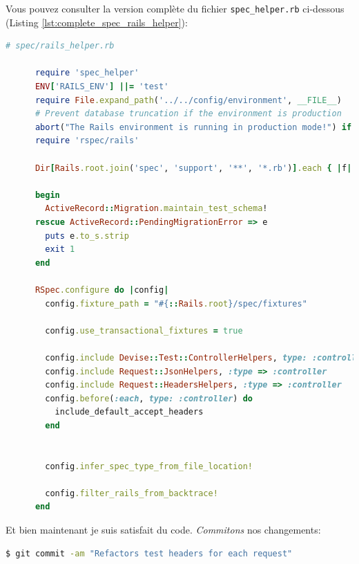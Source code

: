 \documentclass[]{report}
\begin{document}
    Vous pouvez consulter la version complète du fichier \verb|spec_helper.rb| ci-dessous (Listing \ref{lst:complete_spec_rails_helper}):

    \begin{scriptsize}
      \begin{lstlisting}[language=ruby, caption={La version complète de la configuration de Rspec après la factorisation}, label={lst:complete_spec_rails_helper}]
      # spec/rails_helper.rb

      require 'spec_helper'
      ENV['RAILS_ENV'] ||= 'test'
      require File.expand_path('../../config/environment', __FILE__)
      # Prevent database truncation if the environment is production
      abort("The Rails environment is running in production mode!") if Rails.env.production?
      require 'rspec/rails'

      Dir[Rails.root.join('spec', 'support', '**', '*.rb')].each { |f| require f }

      begin
        ActiveRecord::Migration.maintain_test_schema!
      rescue ActiveRecord::PendingMigrationError => e
        puts e.to_s.strip
        exit 1
      end

      RSpec.configure do |config|
        config.fixture_path = "#{::Rails.root}/spec/fixtures"

        config.use_transactional_fixtures = true

        config.include Devise::Test::ControllerHelpers, type: :controller
        config.include Request::JsonHelpers, :type => :controller
        config.include Request::HeadersHelpers, :type => :controller
        config.before(:each, type: :controller) do
          include_default_accept_headers
        end


        config.infer_spec_type_from_file_location!

        config.filter_rails_from_backtrace!
      end
      \end{lstlisting}
    \end{scriptsize}

    Et bien maintenant je suis satisfait du code. \textit{Commitons} nos changements:

    \begin{scriptsize}
      \begin{lstlisting}[language=bash]
      $ git commit -am "Refactors test headers for each request"
      \end{lstlisting}
    \end{scriptsize}
\end{document}

